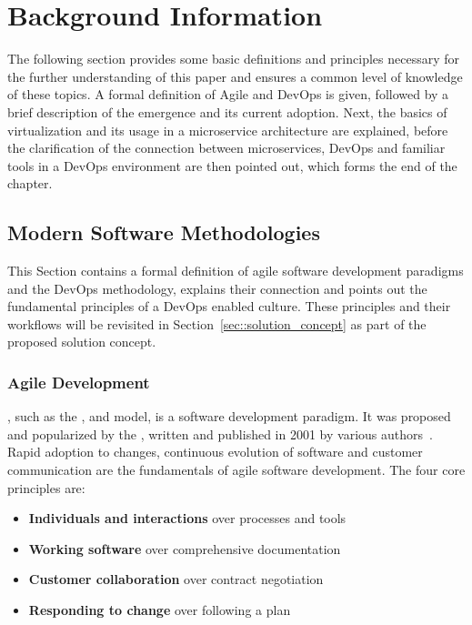 
\section{Background Information}\label{sec::backgrund}
The following section provides some basic definitions and principles necessary for the further understanding of this paper and ensures a common level of knowledge of these topics. A formal definition of Agile and DevOps is given, followed by a brief description of the emergence and its current adoption. Next, the basics of virtualization and its usage in a microservice architecture are explained, before the clarification of the connection between microservices, DevOps and familiar tools in a DevOps environment are then pointed out, which forms the end of the chapter.

    \subsection{Modern Software Methodologies}\label{ssec::devops}
    This Section contains a formal definition of agile software development paradigms and the DevOps methodology, explains their connection and points out the fundamental principles of a DevOps enabled culture. These principles and their workflows will be revisited in Section~\ref{sec::solution_concept} as part of the proposed solution concept.

        \subsubsection{Agile Development}
        , such as the ,  and  model, is a software development paradigm. It was proposed and popularized by the , written and published in 2001 by various authors~\cite{manifesto}. Rapid adoption to changes, continuous evolution of software and customer communication are the fundamentals of agile software development.\newline
        The four core principles are:

        \begin{itemize}[label=\(\star\)]
            \setlength\itemsep{0em}
            \item \textbf{Individuals and interactions} over processes and tools
            \item \textbf{Working software} over comprehensive documentation
            \item \textbf{Customer collaboration} over contract negotiation
            \item \textbf{Responding to change} over following a plan
        \end{itemize}

